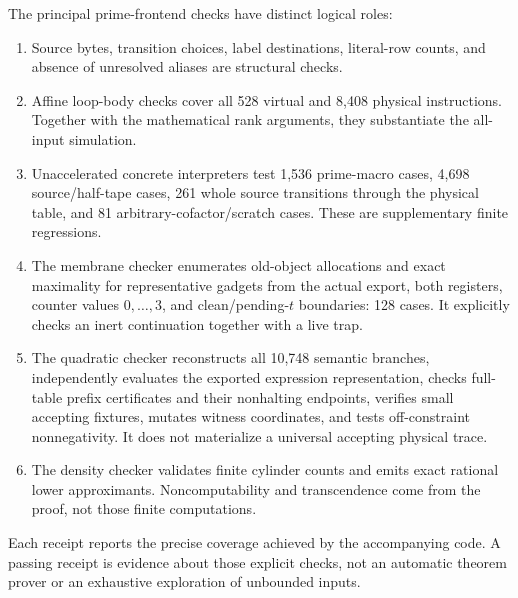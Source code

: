 \documentclass[11pt,letterpaper]{article}
\theoremstyle{definition}
\theoremstyle{remark}
\begin{document}
The principal prime-frontend checks have distinct logical roles:
\begin{enumerate}
\item Source bytes, transition choices, label destinations, literal-row counts, and absence of unresolved aliases are structural checks.
\item Affine loop-body checks cover all 528 virtual and 8,408 physical instructions. Together with the mathematical rank arguments, they substantiate the all-input simulation.
\item Unaccelerated concrete interpreters test 1,536 prime-macro cases, 4,698 source/half-tape cases, 261 whole source transitions through the physical table, and 81 arbitrary-cofactor/scratch cases. These are supplementary finite regressions.
\item The membrane checker enumerates old-object allocations and exact maximality for representative gadgets from the actual export, both registers, counter values $0,\ldots,3$, and clean/pending-$t$ boundaries: 128 cases. It explicitly checks an inert continuation together with a live trap.
\item The quadratic checker reconstructs all 10,748 semantic branches, independently evaluates the exported expression representation, checks full-table prefix certificates and their nonhalting endpoints, verifies small accepting fixtures, mutates witness coordinates, and tests off-constraint nonnegativity. It does not materialize a universal accepting physical trace.
\item The density checker validates finite cylinder counts and emits exact rational lower approximants. Noncomputability and transcendence come from the proof, not those finite computations.
\end{enumerate}
Each receipt reports the precise coverage achieved by the accompanying code. A passing receipt is evidence about those explicit checks, not an automatic theorem prover or an exhaustive exploration of unbounded inputs.
\end{document}
